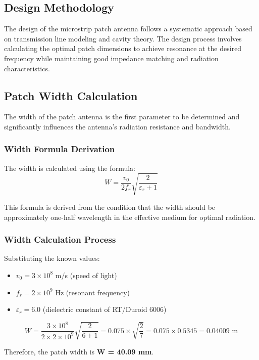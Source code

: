 \documentclass[12pt]{article}
\begin{document}
\subsection{Design Methodology}

The design of the microstrip patch antenna follows a systematic approach based on transmission line modeling and cavity theory. The design process involves calculating the optimal patch dimensions to achieve resonance at the desired frequency while maintaining good impedance matching and radiation characteristics.

\subsection{Patch Width Calculation}

The width of the patch antenna is the first parameter to be determined and significantly influences the antenna's radiation resistance and bandwidth.

\subsubsection{Width Formula Derivation}

The width is calculated using the formula:
\[W = \frac{v_0}{2f_r}\sqrt{\frac{2}{\varepsilon_r + 1}}\]

This formula is derived from the condition that the width should be approximately one-half wavelength in the effective medium for optimal radiation.

\subsubsection{Width Calculation Process}

Substituting the known values:
\begin{itemize}
    \item $v_0 = 3 \times 10^8$ m/s (speed of light)
    \item $f_r = 2 \times 10^9$ Hz (resonant frequency)
    \item $\varepsilon_r = 6.0$ (dielectric constant of RT/Duroid 6006)
\end{itemize}

\[W = \frac{3 \times 10^8}{2 \times 2 \times 10^9}\sqrt{\frac{2}{6 + 1}} = 0.075 \times \sqrt{\frac{2}{7}} = 0.075 \times 0.5345 = 0.04009 \text{ m}\]

Therefore, the patch width is \textbf{W = 40.09 mm}.
\end{document}
